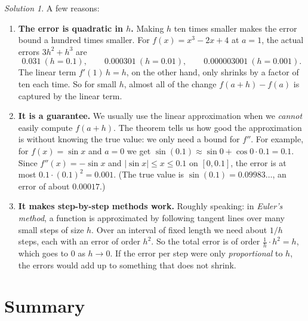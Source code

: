 \documentclass[
  letterpaper,
  DIV=11,
  numbers=noendperiod]{scrreprt}
\providecommand{\tightlist}{%
  \setlength{\itemsep}{0pt}\setlength{\parskip}{0pt}}
\theoremstyle{plain}
\theoremstyle{plain}
\theoremstyle{definition}
\theoremstyle{definition}
\theoremstyle{definition}
\theoremstyle{plain}
\theoremstyle{plain}
\theoremstyle{remark}
\newtheorem*{solution}{Solution}
\begin{document}
\begin{solution}
A few reasons:

\begin{enumerate}
\def\labelenumi{\arabic{enumi}.}
\tightlist
\item
  \textbf{The error is quadratic in \(h\).} Making \(h\) ten times
  smaller makes the error bound a hundred times smaller. For
  \(f(x)=x^3-2x+4\) at \(a=1\), the actual errors \(3h^2+h^3\) are \[
  0.031 \ (h=0.1), \qquad 0.000301\ (h=0.01), \qquad 0.000003001\ (h=0.001) .
  \] The linear term \(f'(1)\,h = h\), on the other hand, only shrinks
  by a factor of ten each time. So for small \(h\), almost all of the
  change \(f(a+h)-f(a)\) is captured by the linear term.
\item
  \textbf{It is a guarantee.} We usually use the linear approximation
  when we \emph{cannot} easily compute \(f(a+h)\). The theorem tells us
  how good the approximation is without knowing the true value: we only
  need a bound for \(f''\). For example, for \(f(x)=\sin x\) and \(a=0\)
  we get \(\sin(0.1)\approx \sin 0 + \cos 0\cdot 0.1 = 0.1\). Since
  \(f''(x) = -\sin x\) and \(\lvert \sin x \rvert\le x\le 0.1\) on
  \([0,0.1]\), the error is at most \(0.1\cdot(0.1)^2 = 0.001\). (The
  true value is \(\sin(0.1) = 0.09983\ldots\), an error of about
  \(0.00017\).)
\item
  \textbf{It makes step-by-step methods work.} Roughly speaking: in
  \emph{Euler's method}, a function is approximated by following tangent
  lines over many small steps of size \(h\). Over an interval of fixed
  length we need about \(1/h\) steps, each with an error of order
  \(h^2\). So the total error is of order \(\frac1h\cdot h^2 = h\),
  which goes to \(0\) as \(h\to0\). If the error per step were only
  \emph{proportional} to \(h\), the errors would add up to something
  that does not shrink.
\end{enumerate}

\end{solution}

\section{Summary}\label{summary-12}
\end{document}

